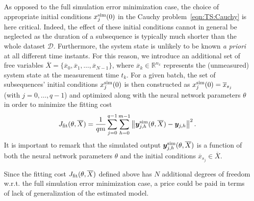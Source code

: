 \documentclass{article} %
\newcommand{\batchsize}{q}
\newcommand{\seqlen}{m}
\newcommand{\nx}{n_x}
\newcommand{\nsamp}{N}
\newcommand{\tens}[1]{\bm{#1}}
\newcommand{\Did}{{\mathcal{D}}}
\newcommand{\simul}[1]{{#1}^{\rm sim}}
\newcommand{\hidden}[1]{\overline{#1}}
\newcommand{\norm}[1]{\left\lVert#1\right\rVert}
\newcommand{\est}{}
\begin{document}
As opposed to the full simulation error minimization case, the choice of appropriate initial conditions $\simul{{x}}_{j}(0)$ in the Cauchy problem~\eqref{eqn:TS:Cauchy} is here critical. Indeed, the effect of these initial conditions cannot in general be neglected as the duration of a subsequence is typically much shorter than the whole dataset $\Did$.
Furthermore, the system state is unlikely to be known \emph{a priori} at all different time instants. 
For this reason, we introduce  an additional  set of free    variables   $\hidden{X} = \{\hidden{x}_0,\hidden{x}_1,\dots,\hidden{x}_{\nsamp-1}\}$,  where $\hidden{x}_k \in \mathbb{R}^{\nx}$  represents the (unmeasured) system 
state at the  measurement time $t_k$. 
For a given batch, the set of subsequences' initial conditions   $\simul{{x}}_{j}(0)$  is then constructed as $\simul{{x}}_{j}(0) = \hidden{x}_{s_j}$ (with $j=0,\ldots,\batchsize-1$) and optimized along with the neural network parameters $\theta$ in order to minimize the fitting cost 
\begin{equation}
\label{eq:simulation_cost_fit}
J_{\rm fit}(\theta,\hidden{X}) = \frac{1}{\batchsize \seqlen}\sum_{j=0}^{\batchsize-1}\sum_{h=0}^{\seqlen-1} \norm{\est{\tens{y}}^{\rm sim}_{j,h}(\theta, \hidden{X}) - {{\tens{y}}}_{j,h}}^2. 
\end{equation}
It is important to remark that the simulated output $\est{\tens{y}}^{\rm sim}_{j,h}(\theta, \hidden{X})$ is a function  of both the neural network parameters $\theta$ and the initial conditions $\hidden{x}_{s_j} \in  \hidden{X}$. 

 Since the fitting cost $J_{\rm fit}(\theta,\hidden{X})$ defined above has $\nsamp$ additional degrees of freedom w.r.t. the full simulation error minimization case, a price could be paid in terms of lack of generalization of the estimated model. 
 
 
\end{document}
